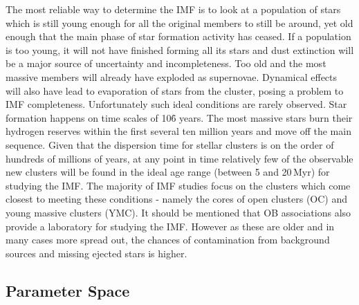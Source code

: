 The most reliable way to determine the IMF is to look at a population of stars which is still young enough for all the original members to still be around, yet old enough that the main phase of star formation activity has ceased. 
If a population is too young, it will not have finished forming all its stars and dust extinction will be a major source of uncertainty and incompleteness. Too old and the most massive members will already have exploded as supernovae. 
Dynamical effects will also have lead to evaporation of stars from the cluster, posing a problem to IMF completeness.
Unfortunately such ideal conditions are rarely observed. 
Star formation happens on time scales of 10\h6 years. 
The most massive stars burn their hydrogen reserves within the first several ten million years and move off the main sequence\needcite. 
Given that the dispersion time for stellar clusters is on the order of hundreds of millions of years, at any point in time relatively few of the observable new clusters will be found in the ideal age range (between 5 and 20\,Myr) for studying the IMF\needcite. 
The majority of IMF studies focus on the clusters which come closest to meeting these conditions - namely the cores of open clusters (OC) and young massive clusters (YMC)\needcite. 
It should be mentioned that OB associations also provide a laboratory for studying the IMF. 
However as these are older and in many cases more spread out, the chances of contamination from background sources and missing ejected stars is higher\needcite. 


\subsection{Parameter Space}

